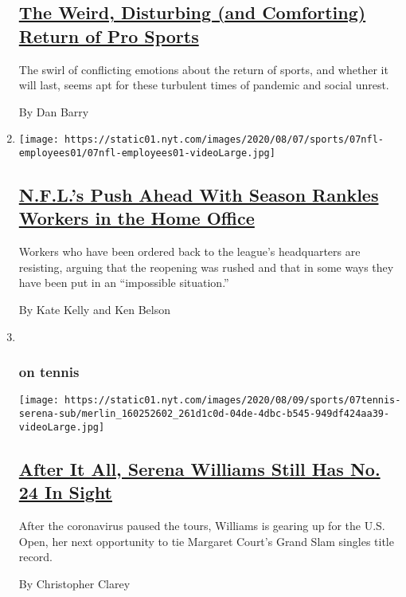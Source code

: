 \begin{enumerate}
  \hypertarget{the-weird-disturbing-and-comforting-return-of-pro-sports}{%
  \subsection{\texorpdfstring{\href{/2020/08/07/sports/coronavirus-restart-nba-baseball.html}{The
  Weird, Disturbing (and Comforting) Return of Pro
  Sports}}{The Weird, Disturbing (and Comforting) Return of Pro Sports}}\label{the-weird-disturbing-and-comforting-return-of-pro-sports}}

  The swirl of conflicting emotions about the return of sports, and
  whether it will last, seems apt for these turbulent times of pandemic
  and social unrest.

  By Dan Barry
\item
  \texttt{[image: https://static01.nyt.com/images/2020/08/07/sports/07nfl-employees01/07nfl-employees01-videoLarge.jpg]}

  \hypertarget{nfls-push-ahead-with-season-rankles-workers-in-the-home-office}{%
  \subsection{\texorpdfstring{\href{/2020/08/07/sports/football/coronavirus-nfl-restart-season.html}{N.F.L.'s
  Push Ahead With Season Rankles Workers in the Home
  Office}}{N.F.L.'s Push Ahead With Season Rankles Workers in the Home Office}}\label{nfls-push-ahead-with-season-rankles-workers-in-the-home-office}}

  Workers who have been ordered back to the league's headquarters are
  resisting, arguing that the reopening was rushed and that in some ways
  they have been put in an ``impossible situation.''

  By Kate Kelly and Ken Belson
\item ~
  \hypertarget{on-tennis}{%
  \subsubsection{on tennis}\label{on-tennis}}

  \texttt{[image: https://static01.nyt.com/images/2020/08/09/sports/07tennis-serena-sub/merlin\_160252602\_261d1c0d-04de-4dbc-b545-949df424aa39-videoLarge.jpg]}

  \hypertarget{after-it-all-serena-williams-still-has-no-24-in-sight}{%
  \subsection{\texorpdfstring{\href{/2020/08/07/sports/tennis/serena-williams-us-open.html}{After
  It All, Serena Williams Still Has No. 24 In
  Sight}}{After It All, Serena Williams Still Has No. 24 In Sight}}\label{after-it-all-serena-williams-still-has-no-24-in-sight}}

  After the coronavirus paused the tours, Williams is gearing up for the
  U.S. Open, her next opportunity to tie Margaret Court's Grand Slam
  singles title record.

  By Christopher Clarey
\end{enumerate}

